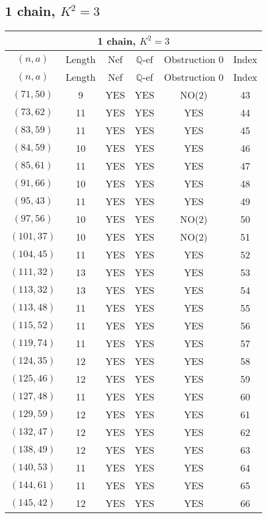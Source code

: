 \subsection{1 chain, $K^2 = 3$}
\begin{longtable}{|c|c|c|c|c|c|}
\hline
\multicolumn{6}{|c|}{1 chain, $K^2 = 3$}\\
\hline
$(n,a)$ & Length & Nef & $\mathbb Q$-ef & Obstruction 0 & Index\\
\hline
\endfirsthead

\hline
$(n,a)$ & Length & Nef & $\mathbb Q$-ef & Obstruction 0 & Index\\
\hline
\endhead
\hline
\endfoot

$(71, 50)$ & 9 & YES & YES & NO(2) & 43\\
$(73, 62)$ & 11 & YES & YES & YES & 44\\
$(83, 59)$ & 11 & YES & YES & YES & 45\\
$(84, 59)$ & 10 & YES & YES & YES & 46\\
$(85, 61)$ & 11 & YES & YES & YES & 47\\
$(91, 66)$ & 10 & YES & YES & YES & 48\\
$(95, 43)$ & 11 & YES & YES & YES & 49\\
$(97, 56)$ & 10 & YES & YES & NO(2) & 50\\
$(101, 37)$ & 10 & YES & YES & NO(2) & 51\\
$(104, 45)$ & 11 & YES & YES & YES & 52\\
$(111, 32)$ & 13 & YES & YES & YES & 53\\
$(113, 32)$ & 13 & YES & YES & YES & 54\\
$(113, 48)$ & 11 & YES & YES & YES & 55\\
$(115, 52)$ & 11 & YES & YES & YES & 56\\
$(119, 74)$ & 11 & YES & YES & YES & 57\\
$(124, 35)$ & 12 & YES & YES & YES & 58\\
$(125, 46)$ & 12 & YES & YES & YES & 59\\
$(127, 48)$ & 11 & YES & YES & YES & 60\\
$(129, 59)$ & 12 & YES & YES & YES & 61\\
$(132, 47)$ & 12 & YES & YES & YES & 62\\
$(138, 49)$ & 12 & YES & YES & YES & 63\\
$(140, 53)$ & 11 & YES & YES & YES & 64\\
$(144, 61)$ & 11 & YES & YES & YES & 65\\
$(145, 42)$ & 12 & YES & YES & YES & 66\\

\end{longtable}
